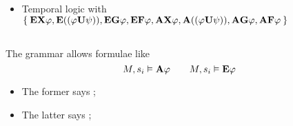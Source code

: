 \subsection{\CTL}

    \begin{itemize}

    \item   Temporal logic with
            $\Set{ \EX{\varphi}, \EU{\varphi}{\psi}, \EG{\varphi},
            \EF{\varphi}, \AX{\varphi}, \AU{\varphi}{\psi}, \AG{\varphi},
            \AF{\varphi} }$

    \end{itemize}

\subsection{\CTLs}

    The grammar allows formulae like
    \[
    M, s_i \Entails \A{\varphi} \qquad M, s_i \Entails \E{\varphi}
    \]
    \begin{itemize}
    \item   The former says ;
    \item   The latter says ;
    \end{itemize}

